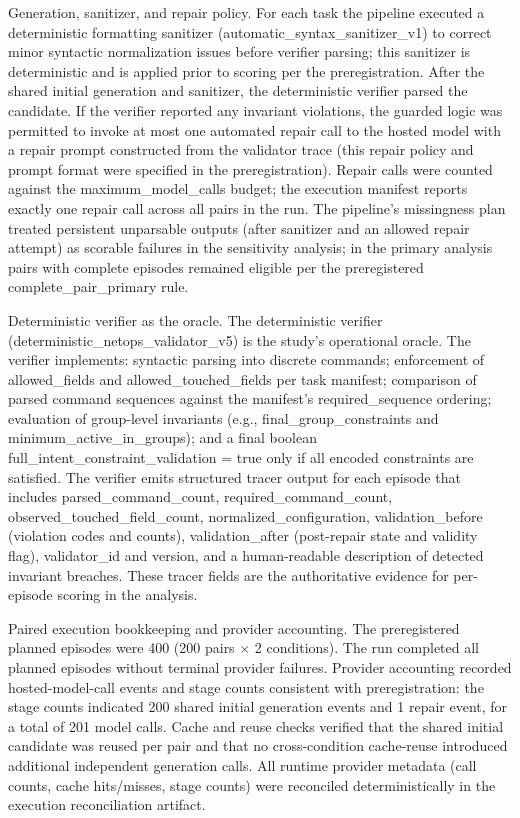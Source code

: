 \documentclass[conference]{IEEEtran}
\begin{document}
Generation, sanitizer, and repair policy. For each task the pipeline executed a deterministic formatting sanitizer (automatic\_syntax\_sanitizer\_v1) to correct minor syntactic normalization issues before verifier parsing; this sanitizer is deterministic and is applied prior to scoring per the preregistration. After the shared initial generation and sanitizer, the deterministic verifier parsed the candidate. If the verifier reported any invariant violations, the guarded logic was permitted to invoke at most one automated repair call to the hosted model with a repair prompt constructed from the validator trace (this repair policy and prompt format were specified in the preregistration). Repair calls were counted against the maximum\_model\_calls budget; the execution manifest reports exactly one repair call across all pairs in the run. The pipeline's missingness plan treated persistent unparsable outputs (after sanitizer and an allowed repair attempt) as scorable failures in the sensitivity analysis; in the primary analysis pairs with complete episodes remained eligible per the preregistered complete\_pair\_primary rule.

Deterministic verifier as the oracle. The deterministic verifier (deterministic\_netops\_validator\_v5) is the study's operational oracle. The verifier implements: syntactic parsing into discrete commands; enforcement of allowed\_fields and allowed\_touched\_fields per task manifest; comparison of parsed command sequences against the manifest's required\_sequence ordering; evaluation of group-level invariants (e.g., final\_group\_constraints and minimum\_active\_in\_groups); and a final boolean full\_intent\_constraint\_validation = true only if all encoded constraints are satisfied. The verifier emits structured tracer output for each episode that includes parsed\_command\_count, required\_command\_count, observed\_touched\_field\_count, normalized\_configuration, validation\_before (violation codes and counts), validation\_after (post-repair state and validity flag), validator\_id and version, and a human-readable description of detected invariant breaches. These tracer fields are the authoritative evidence for per-episode scoring in the analysis.

Paired execution bookkeeping and provider accounting. The preregistered planned episodes were 400 (200 pairs \ensuremath{\times} 2 conditions). The run completed all planned episodes without terminal provider failures. Provider accounting recorded hosted-model-call events and stage counts consistent with preregistration: the stage counts indicated 200 shared initial generation events and 1 repair event, for a total of 201 model calls. Cache and reuse checks verified that the shared initial candidate was reused per pair and that no cross-condition cache-reuse introduced additional independent generation calls. All runtime provider metadata (call counts, cache hits/misses, stage counts) were reconciled deterministically in the execution reconciliation artifact.
\end{document}
